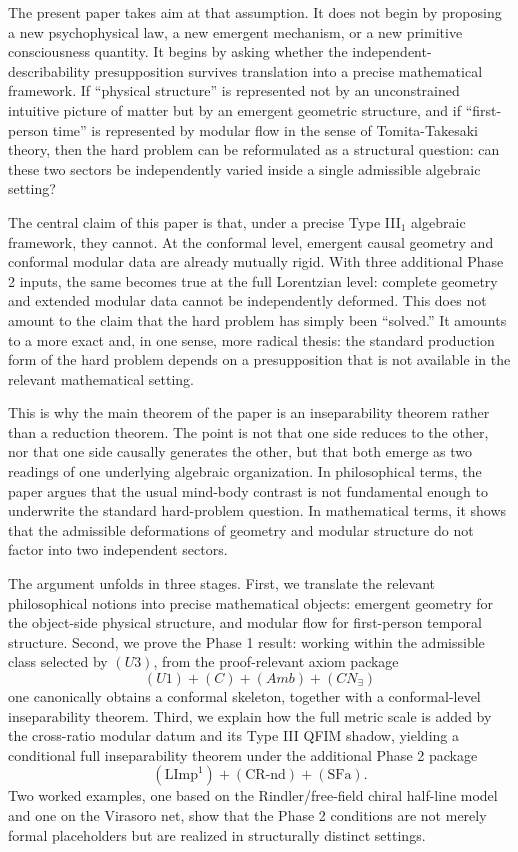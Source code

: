 \documentclass[12pt]{article}
\theoremstyle{definition}
\theoremstyle{remark}
\begin{document}
The present paper takes aim at that assumption. It does not begin by
proposing a new psychophysical law, a new emergent mechanism, or a new
primitive consciousness quantity. It begins by asking whether the
independent-describability presupposition survives translation into a
precise mathematical framework. If ``physical structure'' is represented
not by an unconstrained intuitive picture of matter but by an emergent
geometric structure, and if ``first-person time'' is represented by
modular flow in the sense of Tomita-Takesaki theory, then the hard
problem can be reformulated as a structural question: can these two
sectors be independently varied inside a single admissible algebraic
setting?

The central claim of this paper is that, under a precise Type III\(_1\)
algebraic framework, they cannot. At the conformal level, emergent
causal geometry and conformal modular data are already mutually rigid.
With three additional Phase 2 inputs, the same becomes true at the full
Lorentzian level: complete geometry and extended modular data cannot be
independently deformed. This does not amount to the claim that the hard
problem has simply been ``solved.'' It amounts to a more exact and, in
one sense, more radical thesis: the standard production form of the hard
problem depends on a presupposition that is not available in the
relevant mathematical setting.

This is why the main theorem of the paper is an inseparability theorem
rather than a reduction theorem. The point is not that one side reduces
to the other, nor that one side causally generates the other, but that
both emerge as two readings of one underlying algebraic organization. In
philosophical terms, the paper argues that the usual mind-body contrast
is not fundamental enough to underwrite the standard hard-problem
question. In mathematical terms, it shows that the admissible
deformations of geometry and modular structure do not factor into two
independent sectors.

The argument unfolds in three stages. First, we translate the relevant
philosophical notions into precise mathematical objects: emergent
geometry for the object-side physical structure, and modular flow for
first-person temporal structure. Second, we prove the Phase 1 result:
working within the admissible class selected by \((U3)\), from the
proof-relevant axiom package \[
(U1)+(C)+(Amb)+(CN_\exists)
\] one canonically obtains a conformal skeleton, together with a
conformal-level inseparability theorem. Third, we explain how the full
metric scale is added by the cross-ratio modular datum and its Type III
QFIM shadow, yielding a conditional full inseparability theorem under
the additional Phase 2 package \[
(\mathrm{LImp}^1)+(\mathrm{CR\text{-}nd})+(\mathrm{SFa}).
\] Two worked examples, one based on the Rindler/free-field chiral
half-line model and one on the Virasoro net, show that the Phase 2
conditions are not merely formal placeholders but are realized in
structurally distinct settings.
\end{document}
